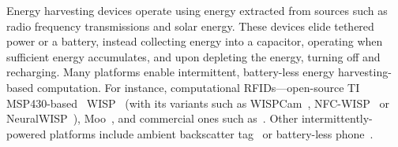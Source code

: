 Energy harvesting devices operate using energy extracted from sources such as radio frequency transmissions and solar energy. These devices elide tethered power or a battery, instead collecting energy into a capacitor, operating when sufficient energy accumulates, and upon depleting the energy, turning off and recharging.
%
%
%
Many platforms enable intermittent, battery-less energy harvesting-based computation. For instance, computational RFIDs---open-source TI MSP430-based~\cite{wolverine} WISP~\cite{wisp5} (with its variants such as WISPCam~\cite{naderiparizi_rfid_2015}, NFC-WISP~\cite{zhao_rfid_2015} or NeuralWISP~\cite{holleman_biocas_2008}), Moo~\cite{moo}, and commercial ones such as~\cite{medusa_farsens_2017}. Other intermittently-powered platforms include ambient backscatter tag~\cite{liu_sigcomm_2013,parks_sigcomm_2014} or battery-less phone~\cite{talla_imwut_2017}. 


